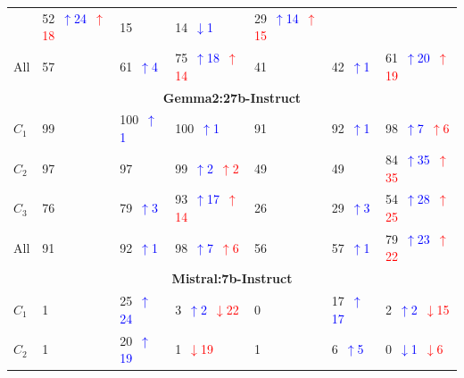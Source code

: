 \begin{table}
\begin{tabularx}{\textwidth}{l X X X X X X}
& 52~\textcolor{blue}{\scriptsize$\uparrow$24}~\textcolor{red}{\scriptsize$\uparrow$18}
& 15 
& 14~\textcolor{blue}{\scriptsize$\downarrow$1}   
& 29~\textcolor{blue}{\scriptsize$\uparrow$14}~\textcolor{red}{\scriptsize$\uparrow$15} \\
All 
& 57 
& 61~\textcolor{blue}{\scriptsize$\uparrow$4}   
& 75~\textcolor{blue}{\scriptsize$\uparrow$18}~\textcolor{red}{\scriptsize$\uparrow$14}
& 41 
& 42~\textcolor{blue}{\scriptsize$\uparrow$1}   
& 61~\textcolor{blue}{\scriptsize$\uparrow$20}~\textcolor{red}{\scriptsize$\uparrow$19} \\
\midrule
\multicolumn{7}{c}{\small\textbf{Gemma2:27b-Instruct}} \\
\midrule
$C_1$ 
& 99 
& 100~\textcolor{blue}{\scriptsize$\uparrow$1}   
& 100~\textcolor{blue}{\scriptsize$\uparrow$1}
& 91 
& 92~\textcolor{blue}{\scriptsize$\uparrow$1}   
& 98~\textcolor{blue}{\scriptsize$\uparrow$7}~\textcolor{red}{\scriptsize$\uparrow$6} \\
$C_2$ 
& 97 
& 97 
& 99~\textcolor{blue}{\scriptsize$\uparrow$2}~\textcolor{red}{\scriptsize$\uparrow$2}
& 49 
& 49 
& 84~\textcolor{blue}{\scriptsize$\uparrow$35}~\textcolor{red}{\scriptsize$\uparrow$35} \\
$C_3$ 
& 76 
& 79~\textcolor{blue}{\scriptsize$\uparrow$3}   
& 93~\textcolor{blue}{\scriptsize$\uparrow$17}~\textcolor{red}{\scriptsize$\uparrow$14}
& 26 
& 29~\textcolor{blue}{\scriptsize$\uparrow$3}   
& 54~\textcolor{blue}{\scriptsize$\uparrow$28}~\textcolor{red}{\scriptsize$\uparrow$25} \\
All 
& 91 
& 92~\textcolor{blue}{\scriptsize$\uparrow$1}   
& 98~\textcolor{blue}{\scriptsize$\uparrow$7}~\textcolor{red}{\scriptsize$\uparrow$6}
& 56 
& 57~\textcolor{blue}{\scriptsize$\uparrow$1}   
& 79~\textcolor{blue}{\scriptsize$\uparrow$23}~\textcolor{red}{\scriptsize$\uparrow$22} \\
\midrule
\multicolumn{7}{c}{\small\textbf{Mistral:7b-Instruct}} \\
\midrule
$C_1$ 
& 1 
& 25~\textcolor{blue}{\scriptsize$\uparrow$24}   
& 3~\textcolor{blue}{\scriptsize$\uparrow$2}~\textcolor{red}{\scriptsize$\downarrow$22}
& 0 
& 17~\textcolor{blue}{\scriptsize$\uparrow$17}   
& 2~\textcolor{blue}{\scriptsize$\uparrow$2}~\textcolor{red}{\scriptsize$\downarrow$15} \\
$C_2$ 
& 1 
& 20~\textcolor{blue}{\scriptsize$\uparrow$19}    
& 1~\textcolor{red}{\scriptsize$\downarrow$19}
& 1 
& 6~\textcolor{blue}{\scriptsize$\uparrow$5}    
& 0~\textcolor{blue}{\scriptsize$\downarrow$1}~\textcolor{red}{\scriptsize$\downarrow$6} \\

\end{tabularx}
\end{table}
